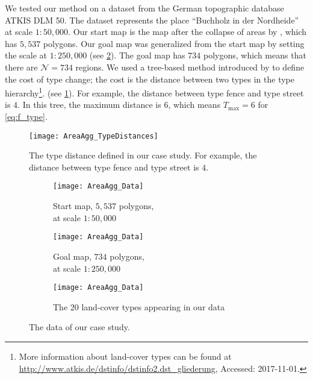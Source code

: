 We tested our method on a dataset 
from the German topographic database ATKIS DLM 50. 
The dataset represents the place 
``Buchholz in der Nordheide'' at scale $1:50{,}000$. 
Our start map is the map after the collapse of areas 
by \citet[pp.~61--66]{haunert2008f}, 
which has $5{,}537$ polygons. 
Our goal map was generalized from the start map 
by \citet{HaunertWolff2010AreaAgg} setting the scale 
at $1:250{,}000$ (see \fig\ref{fig:AreaAgg_Data}). 
The goal map has $734$ polygons, 
which means that there are $\mathcal{N}=734$ regions.  
%
We used a tree-based method introduced by \citet{Schwering2008} 
to define the cost of type change; 
the cost is the distance 
between two types in the type hierarchy\footnote{
More information about land-cover types can be found at 
\url{http://www.atkis.de/dstinfo/dstinfo2.dst_gliederung},
Accessed: 2017-11-01.}. 
(see \fig\ref{fig:AreaAgg_TypeDistances}). 
For example, the distance 
between type fence and type street is $4$.
In this tree, the maximum distance is $6$, 
which means $T_\mathrm{max}=6$ for \eq\ref{eq:f_type}.  

\begin{figure}[tb]
	\centering
	\texttt{[image: AreaAgg\_TypeDistances]}
	\caption{The type distance defined in our case study. 
		For example, the distance 
		between type fence and type street is $4$.}
	\label{fig:AreaAgg_TypeDistances}
\end{figure}

\begin{figure}[tb]
	\captionsetup[subfigure]{labelformat=empty}
	\begin{subfigure}[b]{.49\textwidth}
		\centering
		\texttt{[image: AreaAgg\_Data]}
		\caption{Start map, $5{,}537$ polygons, \\
			at scale $1:50{,}000$}
	\end{subfigure}
	\hfill
	\begin{subfigure}[b]{.49\textwidth}
		\centering
		\texttt{[image: AreaAgg\_Data]}
		\caption{Goal map, $734$ polygons, \\
			at scale $1:250{,}000$}
	\end{subfigure}
	
	\bigskip
	
	\begin{subfigure}{\textwidth}
		\centering
		\texttt{[image: AreaAgg\_Data]}
		\caption{The 20 land-cover types appearing in our data}
	\end{subfigure}
	\caption{The data of our case study.}
	\label{fig:AreaAgg_Data}
\end{figure}

